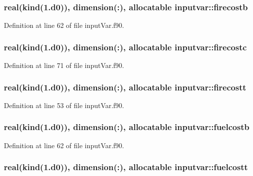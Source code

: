 \hypertarget{classinputvar_a65f37e4fd6eb186d124bc4c8b2c26f4d}{
\subsubsection[{firecostb}]{\setlength{\rightskip}{0pt plus 5cm}real(kind(1.d0)), dimension(\-:), allocatable inputvar\-::firecostb}}\label{classinputvar_a65f37e4fd6eb186d124bc4c8b2c26f4d}


Definition at line 62 of file input\-Var.\-f90.

\hypertarget{classinputvar_a8120efafb95065c490efb058c2a6f9a4}{
\subsubsection[{firecostc}]{\setlength{\rightskip}{0pt plus 5cm}real(kind(1.d0)), dimension(\-:), allocatable inputvar\-::firecostc}}\label{classinputvar_a8120efafb95065c490efb058c2a6f9a4}


Definition at line 71 of file input\-Var.\-f90.

\hypertarget{classinputvar_ac4f3966035d1de814f32b69c620c75a0}{
\subsubsection[{firecostt}]{\setlength{\rightskip}{0pt plus 5cm}real(kind(1.d0)), dimension(\-:), allocatable inputvar\-::firecostt}}\label{classinputvar_ac4f3966035d1de814f32b69c620c75a0}


Definition at line 53 of file input\-Var.\-f90.

\hypertarget{classinputvar_a613d5defd6204729146a9d70f3b81dbe}{
\subsubsection[{fuelcostb}]{\setlength{\rightskip}{0pt plus 5cm}real(kind(1.d0)), dimension(\-:), allocatable inputvar\-::fuelcostb}}\label{classinputvar_a613d5defd6204729146a9d70f3b81dbe}


Definition at line 62 of file input\-Var.\-f90.

\hypertarget{classinputvar_ad2ccd9c466f57cca3096b20a6492b453}{
\subsubsection[{fuelcostt}]{\setlength{\rightskip}{0pt plus 5cm}real(kind(1.d0)), dimension(\-:), allocatable inputvar\-::fuelcostt}}\label{classinputvar_ad2ccd9c466f57cca3096b20a6492b453}


